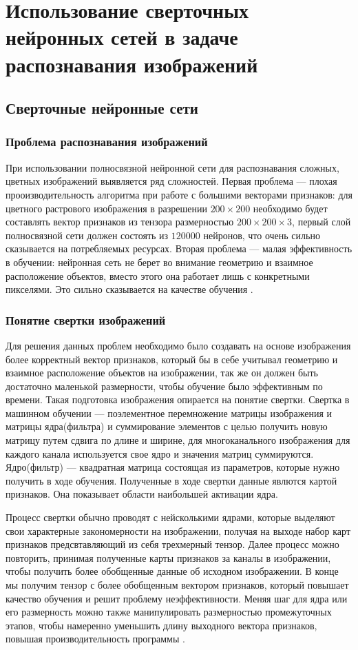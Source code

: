 \chapter{Использование сверточных нейронных сетей в задаче распознавания изображений}

\section{Сверточные нейронные сети}
\subsection{Проблема распознавания изображений}
При использовании полносвязной нейронной сети для распознавания сложных, цветных изображений выявляется ряд сложностей. Первая проблема --- плохая прооизводительность алгоритма при работе с большими векторами признаков: для цветного растрового изображения в разрешении $200 \times 200$ необходимо будет составлять вектор признаков из тензора размерностью $200 \times 200 \times 3$, первый слой полносвязной сети должен состоять из $120000$ нейронов, что очень сильно сказывается на потребляемых ресурсах. Вторая проблема --- малая эффективность в обучении: нейронная сеть не берет во внимание геометрию и взаимное расположение объектов, вместо этого она работает лишь с конкретными пикселями. Это сильно сказывается на качестве обучения \cite{20}.
\subsection{Понятие свертки изображений}
Для решения данных проблем необходимо было создавать на основе изображения более корректный вектор признаков, который бы в себе учитывал геометрию и взаимное расположение объектов на изображении, так же он должен быть достаточно маленькой размерности, чтобы обучение было эффективным по времени. Такая подготовка изображения опирается на понятие свертки. Свертка в машинном обучении --- поэлементное перемножение матрицы изображения и матрицы ядра(фильтра) и суммирование элементов с целью получить новую матрицу путем сдвига по длине и ширине, для многоканального изображения для каждого канала используется свое ядро и значения матриц суммируются. Ядро(фильтр) --- квадратная матрица состоящая из параметров, которые нужно получить в ходе обучения. Полученные в ходе свертки данные явлются картой признаков. Она показывает области наибольшей активации ядра.

Процесс свертки обычно проводят с нейсколькими ядрами, которые выделяют свои характерные закономерности на изображении, получая на выходе набор карт признаков предсвтавляющий из себя трехмерный тензор. Далее процесс можно повторить, принимая полученные карты признаков за каналы в изображении, чтобы получить более обобщенные данные об исходном изображении. В конце мы получим тензор с более обобщенным вектором признаков, который повышает качество обучения и решит проблему неэффективности. Меняя шаг для ядра или его размерность можно также манипулировать размерностью промежуточных этапов, чтобы намеренно уменьшить длину выходного вектора признаков, повышая производительность программы \cite{17,25}.

